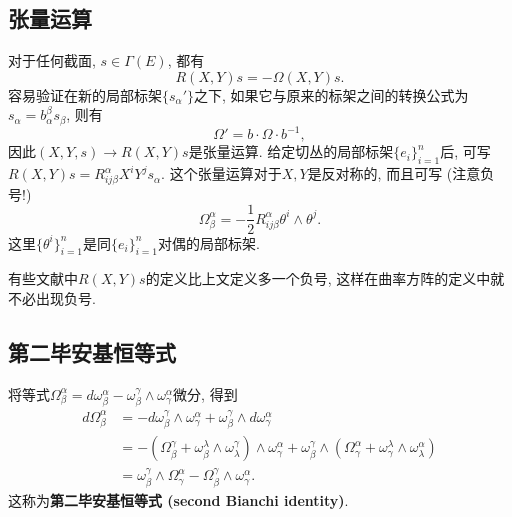 \subsection{张量运算}
对于任何截面, $s\in\Gamma(E)$, 都有
$$
R(X,Y)s=-\Omega(X,Y)s.
$$
容易验证在新的局部标架$\{s_\alpha'\}$之下, 如果它与原来的标架之间的转换公式为$s_\alpha=b_\alpha^\beta s_\beta$, 则有
$$
\Omega'=b\cdot\Omega \cdot b^{-1},
$$
因此$(X,Y,s)\to R(X,Y)s$是张量运算. 给定切丛的局部标架$\{e_i\}_{i=1}^n$后, 可写$R(X,Y)s=R^\alpha_{ij\beta}X^iY^js_\alpha$. 这个张量运算对于$X,Y$是反对称的, 而且可写 (注意负号!)
$$
\Omega_\beta^\alpha=-\frac{1}{2}R^\alpha_{ij\beta}\theta^i\wedge\theta^j.
$$
这里$\{\theta^i\}_{i=1}^n$是同$\{e_i\}_{i=1}^n$对偶的局部标架.

有些文献中$R(X,Y)s$的定义比上文定义多一个负号, 这样在曲率方阵的定义中就不必出现负号.

\subsection{第二毕安基恒等式}
将等式$\Omega_\beta^\alpha=d\omega_\beta^\alpha-\omega_\beta^\gamma\wedge\omega_\gamma^\alpha$微分, 得到
$$
\begin{aligned}
d\Omega_\beta^\alpha&=-d\omega_\beta^\gamma\wedge\omega_\gamma^\alpha+\omega_\beta^\gamma\wedge d\omega_\gamma^\alpha\\
&=-(\Omega_\beta^\gamma+\omega_\beta^\lambda\wedge\omega_\lambda^\gamma)\wedge\omega_\gamma^\alpha
+\omega_\beta^\gamma\wedge(\Omega_\gamma^\alpha+\omega_\gamma^\lambda\wedge\omega_\lambda^\alpha)\\
&=\omega_\beta^\gamma\wedge\Omega_\gamma^\alpha-\Omega_\beta^\gamma\wedge\omega_\gamma^\alpha.
\end{aligned}
$$
这称为\textbf{第二毕安基恒等式 (second Bianchi identity)}.